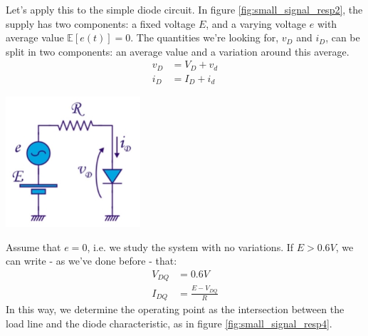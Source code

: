 \begin{minipage}{.6\textwidth}
	Let's apply this to the simple diode circuit. In figure \ref{fig:small_signal_resp2}, the supply has two components: a fixed voltage $E$, and a varying voltage $e$ with average value $\mathds{E}[e(t)] = 0$. The quantities we're looking for, $v_D$ and $i_D$, can be split in two components: an average value and a variation around this average.
	\begin{equation}
		\begin{split}
			v_D &= V_D + v_d\\
			i_D &= I_D + i_d
		\end{split}
	\end{equation}
\end{minipage}
\begin{minipage}{.4\textwidth}
	\centering
	\includegraphics[width=5cm]{figures/ch02/small_signal_resp2.jpg}
	\label{fig:small_signal_resp2}
\end{minipage}%

Assume that $e=0$, i.e. we study the system with no variations. If $E > 0.6V$, we can write - as we've done before - that:
\begin{equation}
	\begin{split}
		V_{DQ} &= 0.6V\\
		I_{DQ} &= \frac{E-V_{DQ}}{R}
	\end{split}
\end{equation}
In this way, we determine the operating point as the intersection between the load line and the diode characteristic, as in figure \ref{fig:small_signal_resp4}.

